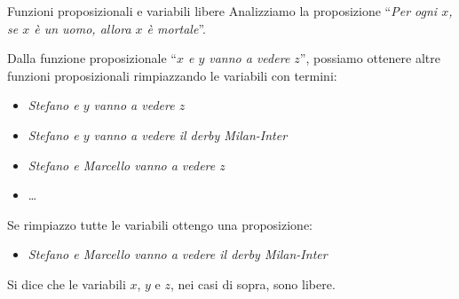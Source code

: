 \documentclass[aspectratio=169,10pt,dvipsnames]{beamer}
\begin{document}
\begin{frame}{Funzioni proposizionali e variabili libere}
	Analizziamo la proposizione ``{\itshape Per ogni $x$, se $x$ è un uomo, allora $x$ è mortale}''.

	\medskip

	\pause
	\medskip
	Dalla funzione proposizionale ``{\itshape $x$ e $y$ vanno a vedere $z$}'', possiamo ottenere altre funzioni proposizionali rimpiazzando le variabili con termini:
	\begin{itemize}
		\item {\itshape Stefano e $y$ vanno a vedere $z$}
		\item {\itshape Stefano e $y$ vanno a vedere il derby Milan-Inter}
		\item {\itshape Stefano e Marcello vanno a vedere $z$}
		\item \ldots
	\end{itemize}
	Se rimpiazzo tutte le variabili ottengo una proposizione:
	\begin{itemize}
		\item {\itshape Stefano e Marcello vanno a vedere  il derby Milan-Inter}
	\end{itemize}
	Si dice che le variabili $x$, $y$ e $z$, nei casi di sopra, sono \alert{libere}.
\end{frame}
\end{document}
